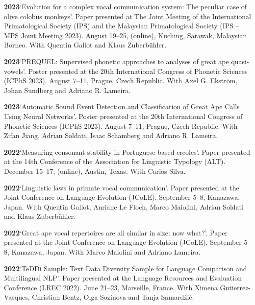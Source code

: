 \documentclass[11pt]{article}
\newcommand{\hangpara}{
 \setlength{\parindent}{0in} %
 \hangindent=0.42in %
}
\begin{document}
\hangpara
\vskip 6pt
{\bf 2023}\hspace{1ex}`Evolution for a complex vocal communication system: The peculiar case of olive colobus monkeys'. Paper presented at The Joint Meeting of the International Primatological Society (IPS) and the Malaysian Primatological Society (IPS -- MPS Joint Meeting 2023). August 19--25, (online), Kuching, Sarawak, Malaysian Borneo. With Quentin Gallot and Klaus Zuberbühler.

\hangpara
\vskip 6pt
{\bf 2023}\hspace{1ex}`PREQUEL: Supervised phonetic approaches to analyses of great ape quasi-vowels'. Poster presented at the 20th International Congress of Phonetic Sciences (ICPhS 2023). August 7--11, Prague, Czech Republic. With Axel G. Ekstr{\"o}m, Johan Sundberg and Adriano R. Lameira. 

\hangpara
\vskip 6pt
{\bf 2023}\hspace{1ex}`Automatic Sound Event Detection and Classification of Great Ape Calls Using Neural Networks'. Poster presented at the 20th International Congress of Phonetic Sciences (ICPhS 2023). August 7--11, Prague, Czech Republic. With Zifan Jiang, Adrian Soldati, Isaac Schamberg and Adriano R. Lameira.

\hangpara
\vskip 6pt
{\bf 2022}\hspace{1ex}`Measuring consonant stability in Portuguese-based creoles'. Paper presented at the 14th Conference of the Association for Linguistic Typology (ALT). December 15--17, (online), Austin, Texas. With Carlos Silva.

\hangpara
\vskip 6pt
{\bf 2022}\hspace{1ex}`Linguistic laws in primate vocal communication'. Paper presented at the Joint Conference on Language Evolution (JCoLE). September 5--8, Kanazawa, Japan. With Quentin Gallot, Auriane Le Floch, Marco Maiolini, Adrian Soldati and Klaus Zuberbühler.

\hangpara
\vskip 6pt
{\bf 2022}\hspace{1ex}`Great ape vocal repertoires are all similar in size: now what?'. Paper presented at the Joint Conference on Language Evolution (JCoLE). September 5--8, Kanazawa, Japan. With Marco Maiolini and Adriano Lameira.

\hangpara
\vskip 6pt
{\bf 2022}\hspace{1ex}`TeDDi Sample: Text Data Diversity Sample for Language Comparison and Multilingual NLP'. Paper presented at the Language Resources and Evaluation Conference (LREC 2022). June 21--23, Marseille, France. With Ximena Gutierrez-Vasques, Christian Bentz, Olga Sozinova and Tanja Samardžić.
\end{document}
